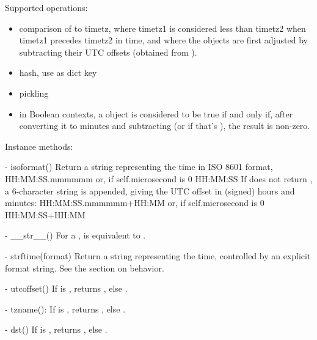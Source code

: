Supported operations:

\begin{itemize}
  \item
    comparison of  to timetz, where timetz1 is considered
    less than timetz2 when timetz1 precedes timetz2 in time, and
    where the  objects are first adjusted by subtracting
    their UTC offsets (obtained from ).

  \item
    hash, use as dict key

  \item
    pickling

  \item
    in Boolean contexts, a  object is considered to be
    true if and only if, after converting it to minutes and
    subtracting  (or  if that's
    ), the result is non-zero.
\end{itemize}

Instance methods:

  - isoformat()
    Return a string representing the time in ISO 8601 format,
        HH:MM:SS.mmmmmm
    or, if self.microsecond is 0
        HH:MM:SS
    If  does not return , a 6-character
    string is appended, giving the UTC offset in (signed) hours and
    minutes:
        HH:MM:SS.mmmmmm+HH:MM
    or, if self.microsecond is 0
        HH:MM:SS+HH:MM

  - __str__()
    For a  ,  is equivalent to
    .

  - strftime(format)
    Return a string representing the time, controlled by an explicit
    format string.  See the section on  behavior.

  - utcoffset()
    If  is , returns , else
    .

  - tzname():
    If  is , returns , else
    .

  - dst()
    If  is , returns , else
    .



\subsection{   \label{datetime-datetimetz}}

